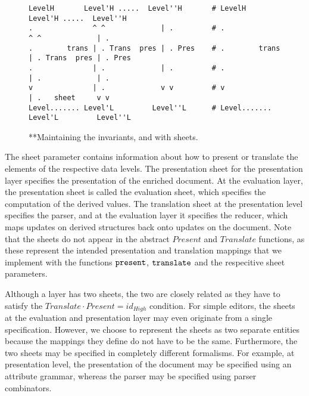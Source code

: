 \begin{figure}
\begin{center}
\begin{center}
 
\bc
\begin{footnotesize}
\begin{verbatim}
LevelH       Level'H .....  Level''H       # LevelH       Level'H .....  Level''H     
.              ^ ^             | .         # .              ^ ^             | .       
.        trans | . Trans  pres | . Pres    # .        trans | . Trans  pres | . Pres  
.              | .             | .         # .              | .             | .       
v              | .             v v         # v              | .   sheet     v v       
Level....... Level'L         Level''L      # Level....... Level'L         Level''L    
\end{verbatim}
\end{footnotesize}
\ec\end{center}
\caption{**Maintaining the invariants, and with sheets.}\label{maintainingInvs} 
\end{center}
\end{figure}


The sheet parameter contains information about how to present or translate the elements of the respective data levels. The presentation sheet for the presentation layer specifies the presentation of the enriched document. At the evaluation layer, the presentation sheet is called the evaluation sheet, which specifies the computation of the derived values. The translation sheet at the presentation level specifies the parser, and at the evaluation layer it specifies the reducer, which maps updates on derived structures back onto updates on the document. Note that the sheets do not appear in the abstract $Present$ and $Translate$ functions, as these represent the intended presentation and translation mappings that we implement with the functions ${\tt present}$, ${\tt translate}$ and the respecitive sheet parameters. 

Although a layer has two sheets, the two are closely related as they have to satisfy the
$Translate \cdot Present = id_{High}$ condition. For simple editors, the sheets at the evaluation and presentation layer may even originate from a single specification. However, we choose to represent the sheets as two separate entities because the mappings they define do not have to be the same.  Furthermore, the two sheets may be specified in completely different formalisms. For example, at presentation level, the presentation of the document may be specified using an attribute grammar, whereas the parser may be specified using parser combinators.



